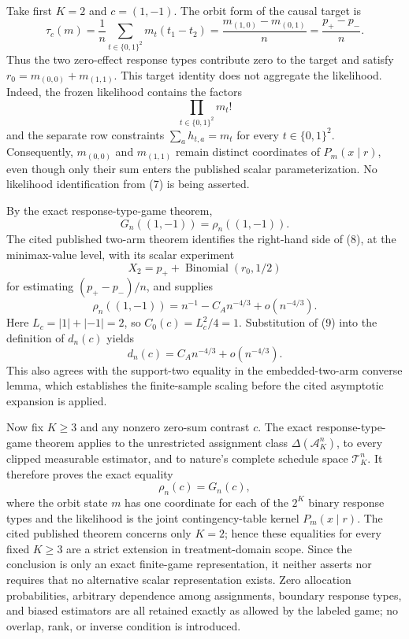 Take first \(K=2\) and \(c=(1,-1)\). The orbit form of the causal target is
\[
 \tau_c(m)
 =\frac1n\sum_{t\in\{0,1\}^2}m_t(t_1-t_2)
 =\frac{m_{(1,0)}-m_{(0,1)}}n
 =\frac{p_+-p_-}{n}.
 \tag{7}
\]
Thus the two zero-effect response types contribute zero to the target and satisfy \(r_0=m_{(0,0)}+m_{(1,1)}\). This target identity does not aggregate the likelihood. Indeed, the frozen likelihood contains the factors
\[
 \prod_{t\in\{0,1\}^2}m_t!
\]
and the separate row constraints \(\sum_a h_{t,a}=m_t\) for every \(t\in\{0,1\}^2\). Consequently, \(m_{(0,0)}\) and \(m_{(1,1)}\) remain distinct coordinates of \(P_m(x\mid r)\), even though only their sum enters the published scalar parameterization. No likelihood identification from (7) is being asserted.

By the exact response-type-game theorem,
\[
 G_n((1,-1))=\rho_n((1,-1)).
 \tag{8}
\]
The cited published two-arm theorem identifies the right-hand side of (8), at the minimax-value level, with its scalar experiment
\[
 X_2=p_++\operatorname{Binomial}(r_0,1/2)
\]
for estimating \((p_+-p_-)/n\), and supplies
\[
 \rho_n((1,-1))=n^{-1}-C_A n^{-4/3}+o(n^{-4/3}).
 \tag{9}
\]
Here \(L_c=|1|+|-1|=2\), so \(C_0(c)=L_c^2/4=1\). Substitution of (9) into the definition of \(d_n(c)\) yields
\[
 d_n(c)=C_A n^{-4/3}+o(n^{-4/3}).
\]
This also agrees with the support-two equality in the embedded-two-arm converse lemma, which establishes the finite-sample scaling before the cited asymptotic expansion is applied.

Now fix \(K\geq3\) and any nonzero zero-sum contrast \(c\). The exact response-type-game theorem applies to the unrestricted assignment class \(\Delta(\mathcal A_K^n)\), to every clipped measurable estimator, and to nature's complete schedule space \(\mathcal T_K^n\). It therefore proves the exact equality
\[
 \rho_n(c)=G_n(c),
\]
where the orbit state \(m\) has one coordinate for each of the \(2^K\) binary response types and the likelihood is the joint contingency-table kernel \(P_m(x\mid r)\). The cited published theorem concerns only \(K=2\); hence these equalities for every fixed \(K\geq3\) are a strict extension in treatment-domain scope. Since the conclusion is only an exact finite-game representation, it neither asserts nor requires that no alternative scalar representation exists. Zero allocation probabilities, arbitrary dependence among assignments, boundary response types, and biased estimators are all retained exactly as allowed by the labeled game; no overlap, rank, or inverse condition is introduced.